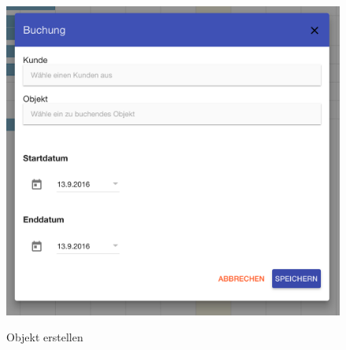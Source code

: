 \begin{figure}[H]
    \centering
    \begin{minipage}[t]{0.49\linewidth}
        \centering
        \includegraphics[width=\linewidth]{images/frontend_booking_new.png}
        \label{frontend_booking_new}
        \caption{Objekt erstellen}
    \end{minipage}%
    \hfill
    \begin{minipage}[t]{0.49\linewidth}
        \centering

\end{minipage}
\end{figure}
